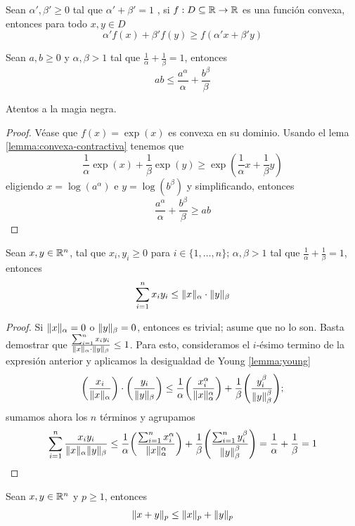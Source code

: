 \begin{lemma}\label{lemma:convexa-contractiva}
  Sean $\alpha ',\beta '\geq 0$ tal que $\alpha'+\beta'=1$ , si $f:D\subseteq \mathbb{R} \to \mathbb{R}$ es una función convexa, entonces para todo $x,y\in D$ \[
      \alpha' f(x)+\beta' f(y)\ge f(\alpha' x+\beta' y)
  \]
\end{lemma}
\begin{lemma}\label{lemma:young}
  Sean $a,b\ge 0$ y $\alpha,\beta>1$ tal que $\frac{1}{\alpha}+\frac{1}{\beta}=1$, entonces 
  \[
      ab\le \frac{a^\alpha}{\alpha}+\frac{b^\beta}{\beta}
  \]  
\end{lemma}
Atentos a la magia negra.
\begin{proof}
  Véase que $f(x)=\exp(x)$ es convexa en su dominio. Usando el lema \ref{lemma:convexa-contractiva} tenemos que \[
      \frac{1}{\alpha}\exp(x)+\frac{1}{\beta}\exp(y)\ge \exp(\frac{1}{\alpha}x+\frac{1}{\beta}y)
  \] 
  eligiendo $x=\log(a^\alpha)$ e $y=\log(b^\beta)$ y simplificando, entonces 
  \[
      \frac{a^\alpha}{\alpha}+\frac{b^\beta}{\beta}\ge ab
  \]  
\end{proof}
\begin{lemma}
  Sean $x,y\in \mathbb{R}^n$, tal que $x_{i},y_{i}\ge 0$ para $i\in \{1,\ldots,n\}$; $\alpha,\beta>1 $ tal que $\frac{1}{\alpha}+\frac{1}{\beta}=1$, entonces 
  \[
    \sum_{i=1}^{n} x_{i}y_{i}\le \lVert x\rVert_\alpha\cdot\lVert y\rVert_\beta
  \] 
\end{lemma}
\begin{proof}
  Si $\lVert x\rVert_\alpha=0$ o $\lVert y\rVert_\beta=0$, entonces es trivial; asume que no lo son. Basta demostrar que $\frac{\sum_{i=1}^{n} x_{i} y_{i}}{\lVert x\rVert_\alpha \cdot\lVert y\rVert_\beta}\le 1$. Para esto, consideramos el $i$-ésimo termino de la expresión anterior y aplicamos la desigualdad de Young \ref{lemma:young} \[
    \parens*{ \frac{x_{i}}{\norm{x}_\alpha}}\cdot 
    \parens*{\frac{y_{i}}{\norm{y}_\beta}}\le 
\frac{1}{\alpha}\parens*{ \frac{x_{i}^\alpha}{\norm{x}_\alpha^\alpha}}+
    \frac{1}{\beta}\parens*{\frac{y_{i}^\beta}{\norm{y}_\beta^\beta}} 
  ;\]
  sumamos ahora los $n$ términos y agrupamos \[
     \sum_{i=1}^{n} \frac{x_{i}y_{i}}{\norm{x}_\alpha\norm{y}_\beta}\le 
\frac{1}{\alpha}\parens*{ \frac{\sum_{i=1}^{n} x_{i}^\alpha}{\norm{x}_\alpha^\alpha}}+
    \frac{1}{\beta}\parens*{\frac{\sum_{i=1}^{n} y_{i}^\beta}{\norm{y}_\beta^\beta}}=\frac{1}{\alpha}+\frac{1}{\beta}=1
  \] 
\end{proof}
\begin{lemma}
  Sean $x,y\in\mathbb{R}^n$ y $p\ge 1$, entonces \[
      \lVert x+y\rVert_p\le \lVert x\rVert_p+\lVert y\rVert_p
  \] 
\end{lemma}
